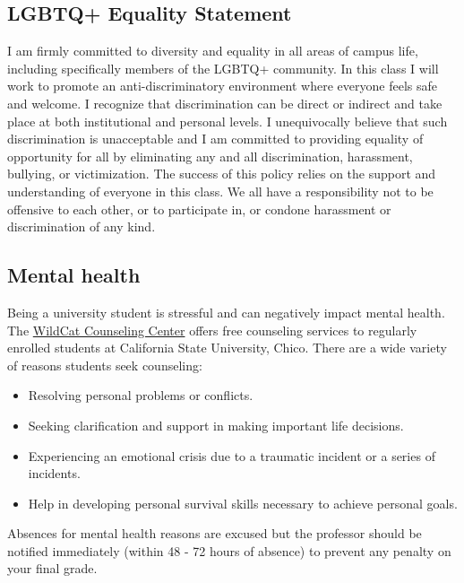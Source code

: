 \documentclass[11pt,]{article}
\providecommand{\tightlist}{%
  \setlength{\itemsep}{0pt}\setlength{\parskip}{0pt}}
\begin{document}
\hypertarget{lgbtq-equality-statement}{%
\subsection{LGBTQ+ Equality Statement}\label{lgbtq-equality-statement}}

I am firmly committed to diversity and equality in all areas of campus
life, including specifically members of the LGBTQ+ community. In this
class I will work to promote an anti-discriminatory environment where
everyone feels safe and welcome. I recognize that discrimination can be
direct or indirect and take place at both institutional and personal
levels. I unequivocally believe that such discrimination is unacceptable
and I am committed to providing equality of opportunity for all by
eliminating any and all discrimination, harassment, bullying, or
victimization. The success of this policy relies on the support and
understanding of everyone in this class. We all have a responsibility
not to be offensive to each other, or to participate in, or condone
harassment or discrimination of any kind.

\hypertarget{mental-health}{%
\subsection{Mental health}\label{mental-health}}

Being a university student is stressful and can negatively impact mental
health. The \href{https://www.csuchico.edu/counseling/}{WildCat
Counseling Center} offers free counseling services to regularly enrolled
students at California State University, Chico. There are a wide variety
of reasons students seek counseling:

\begin{itemize}
\tightlist
\item
  Resolving personal problems or conflicts.
\item
  Seeking clarification and support in making important life decisions.
\item
  Experiencing an emotional crisis due to a traumatic incident or a
  series of incidents.
\item
  Help in developing personal survival skills necessary to achieve
  personal goals.
\end{itemize}

Absences for mental health reasons are excused but the professor should
be notified immediately (within 48 - 72 hours of absence) to prevent any
penalty on your final grade.
\end{document}
